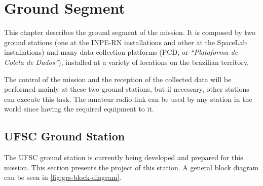 %
%
%
%
%

%
%
%
%
%
%

\chapter{Ground Segment} \label{ch:ground-segment}

This chapter describes the ground segment of the mission. It is composed by two ground stations (one at the INPE-RN installations and other at the SpaceLab installations) and many data collection platforms (PCD, or \textit{``Plataforma de Coleta de Dados''}), installed at a variety of locations on the brazilian territory.

The control of the mission and the reception of the collected data will be performed mainly at these two ground stations, but if necessary, other stations can execute this task. The amateur radio link can be used by any station in the world since having the required equipment to it.

\section{UFSC Ground Station}

The UFSC ground station is currently being developed and prepared for this mission. This section presents the project of this station. A general block diagram can be seen in \autoref{fig:grs-block-diagram}.

